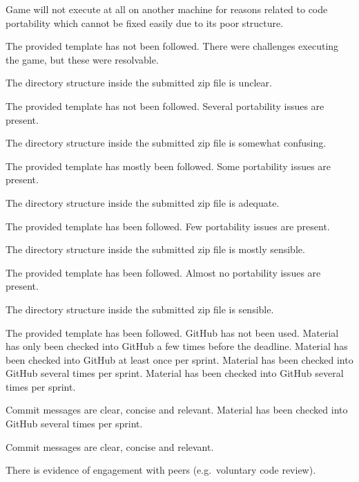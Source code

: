 \documentclass{../fal_assignment}
\begin{document}
\begin{markingrubric}
%
        \grade\fail Game will not execute at all on another machine for reasons related to code portability which cannot be fixed easily due to its poor structure.
            \par The provided template has not been followed.
        \grade There were challenges executing the game, but these were resolvable.
            \par The directory structure inside the submitted zip file is unclear.
            \par The provided template has not been followed.
        \grade Several portability issues are present.
            \par The directory structure inside the submitted zip file is somewhat confusing.
            \par The provided template has mostly been followed.
        \grade Some portability issues are present.
            \par The directory structure inside the submitted zip file is adequate.
            \par The provided template has been followed.
        \grade Few portability issues are present.
            \par The directory structure inside the submitted zip file is mostly sensible.
            \par The provided template has been followed.
        \grade Almost no portability issues are present.
            \par The directory structure inside the submitted zip file is sensible.
            \par The provided template has been followed.
%
        \grade\fail GitHub has not been used.
        \grade Material has only been checked into GitHub a few times before the deadline.
        \grade Material has been checked into GitHub at least once per sprint.
        \grade Material has been checked into GitHub several times per sprint.
        \grade Material has been checked into GitHub several times per sprint.
            \par Commit messages are clear, concise and relevant.
        \grade Material has been checked into GitHub several times per sprint.
            \par Commit messages are clear, concise and relevant.
            \par There is evidence of engagement with peers (e.g.\ voluntary code review).
\end{markingrubric}
\end{document}
